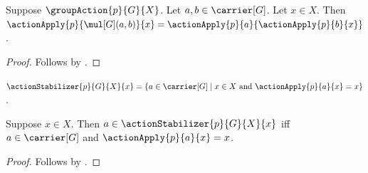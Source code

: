 \begin{proposition}\label{group_action_mul}
    Suppose $\groupAction{p}{G}{X}$.
    Let $a,b\in\carrier[G]$.
    Let $x\in X$.
    Then
        $\actionApply{p}{\mul[G](a,b)}{x}=
            \actionApply{p}{a}{\actionApply{p}{b}{x}}$.
\end{proposition}
\begin{proof}
    Follows by
        .
\end{proof}

\begin{definition}\label{action_stabilizer}
    $\actionStabilizer{p}{G}{X}{x}=
        \{a\in\carrier[G]\mid
            \text{$x\in X$ and $\actionApply{p}{a}{x}=x$}\}$.
\end{definition}

\begin{proposition}\label{action_stabilizer_iff}
    Suppose $x\in X$.
    Then $a\in\actionStabilizer{p}{G}{X}{x}$ iff
        $a\in\carrier[G]$ and $\actionApply{p}{a}{x}=x$.
\end{proposition}
\begin{proof}
    Follows by .
\end{proof}

